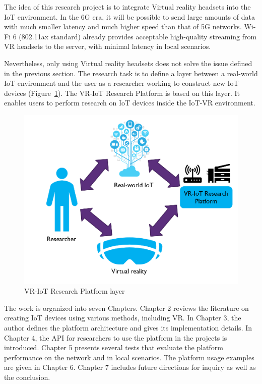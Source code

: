 The idea of this research project is to integrate Virtual reality headsets into the IoT environment. In the 6G era, it will be possible to send large amounts of data with much smaller latency and much higher speed than that of 5G networks. Wi-Fi 6 (802.11ax standard) already provides acceptable high-quality streaming from VR headsets to the server, with minimal latency in local scenarios.

Nevertheless, only using Virtual reality headsets does not solve the issue defined in the previous section. The research task is to define a layer between a real-world IoT environment and the user as a researcher working to construct new IoT devices (Figure~\ref{fig:VR-IoTResearchPlatformLayer-figure}). The VR-IoT Research Platform is based on this layer. It enables users to perform research on IoT devices inside the IoT-VR environment.

\begin{figure} 
  \centering
  \includegraphics[width=0.9\linewidth]{figures/VR-IoTResearchPlatformLayer.png}
  \caption{VR-IoT Research Platform layer}
  \label{fig:VR-IoTResearchPlatformLayer-figure}
\end{figure}

The work is organized into seven Chapters. Chapter 2 reviews the literature on creating IoT devices using various methods, including VR. In Chapter 3, the author defines the platform architecture and gives its implementation details. In Chapter 4, the API for researchers to use the platform in the projects is introduced. Chapter 5 presents several tests that evaluate the platform performance on the network and in local scenarios. The platform usage examples are given in Chapter 6. Chapter 7 includes future directions for inquiry as well as the conclusion.



